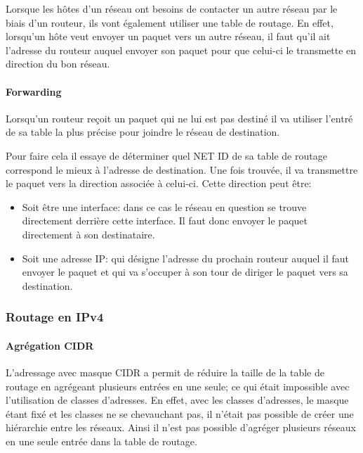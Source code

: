 Lorsque les hôtes d'un réseau ont besoins de contacter un autre réseau par le
biais d'un routeur, ils vont également utiliser une table de routage.  En
effet, lorsqu'un hôte veut envoyer un paquet vers un autre réseau, il faut
qu'il ait l'adresse du routeur auquel envoyer son paquet pour que celui-ci le
transmette en direction du bon réseau.

\paragraph{Forwarding}

Lorsqu'un routeur reçoit un paquet qui ne lui est pas destiné il va utiliser
l'entré de sa table la plus précise pour joindre le réseau de destination.

Pour faire cela il essaye de déterminer quel NET ID de sa table de routage
correspond le mieux à l'adresse de destination.  Une fois trouvée, il va transmettre
le paquet vers la direction associée à celui-ci.
Cette direction peut être:
\begin{itemize}
\item Soit être une interface: dans ce cas le réseau en question se trouve
directement derrière cette interface. Il faut donc envoyer le paquet
directement à son destinataire.
\item Soit une adresse IP: qui désigne l'adresse du prochain routeur auquel il
faut envoyer le paquet et qui va s'occuper à son tour de diriger le paquet vers
sa destination.
\end{itemize}

\subsubsection{Routage en IPv4}
\paragraph{Agrégation CIDR}
L'adressage avec masque CIDR a permit de réduire la taille de la table de
routage en agrégeant plusieurs entrées en une seule; ce qui était impossible avec
l'utilisation de classes d'adresses.  En effet, avec les classes d'adresses, le
masque étant fixé et les classes ne se chevauchant pas, il n'était pas
possible de créer une hiérarchie entre les réseaux.  Ainsi il n'est pas
possible d'agréger plusieurs réseaux en une seule entrée dans la table de
routage.

